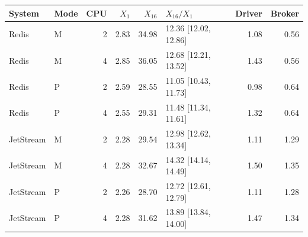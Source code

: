 \begin{tabular}{llrrrlrr}
\toprule
System & Mode & CPU & $X_1$ & $X_{16}$ & $X_{16}/X_1$ & Driver & Broker\\
\midrule
Redis & M & 2 & 2.83 & 34.98 & 12.36 [12.02, 12.86] & 1.08 & 0.56\\
Redis & M & 4 & 2.85 & 36.05 & 12.68 [12.21, 13.52] & 1.43 & 0.56\\
Redis & P & 2 & 2.59 & 28.55 & 11.05 [10.43, 11.73] & 0.98 & 0.64\\
Redis & P & 4 & 2.55 & 29.31 & 11.48 [11.34, 11.61] & 1.32 & 0.64\\
JetStream & M & 2 & 2.28 & 29.54 & 12.98 [12.62, 13.34] & 1.11 & 1.29\\
JetStream & M & 4 & 2.28 & 32.67 & 14.32 [14.14, 14.49] & 1.50 & 1.35\\
JetStream & P & 2 & 2.26 & 28.70 & 12.72 [12.61, 12.79] & 1.11 & 1.28\\
JetStream & P & 4 & 2.28 & 31.62 & 13.89 [13.84, 14.00] & 1.47 & 1.34\\
\bottomrule
\end{tabular}
